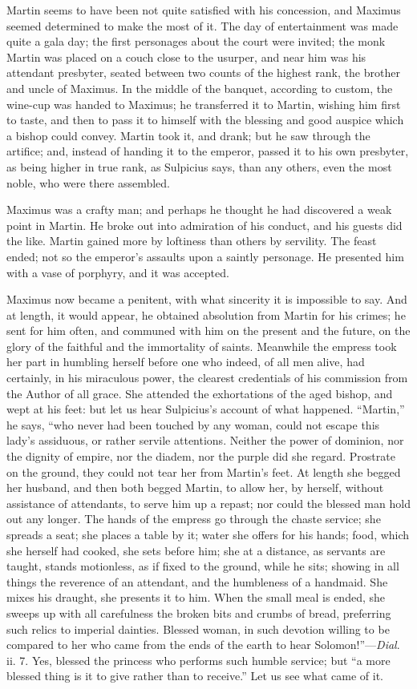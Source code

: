 Martin seems to have been not quite satisfied with his concession,
and Maximus seemed determined to make the most of it. The day of
entertainment was made quite a gala day; the first personages about
the court were invited; the monk Martin was placed on a couch close to
the usurper, and near him was his attendant presbyter, seated between
two counts of the highest rank, the brother and uncle of Maximus. In
the middle of the banquet, according to custom, the wine-cup was
handed to Maximus; he transferred it to Martin, wishing him first to
taste, and then to pass it to himself with the blessing and good
auspice which a bishop could convey. Martin took it, and drank; but he
saw through the artifice; and, instead of handing it to the emperor,
passed it to his own presbyter, as being higher in true rank, as
Sulpicius says, than any others, even the most noble, who were there
assembled.

Maximus was a crafty man; and perhaps he thought he had discovered
a weak point in Martin. He broke out into admiration of his conduct,
and his guests did the like. Martin gained more by loftiness than
others by servility. The feast ended; not so the emperor's assaults
upon a saintly personage. He presented him with a vase of porphyry,
and it was accepted.

Maximus now became a penitent, with what sincerity it is impossible
to say. And at length, it would appear, he obtained absolution from
Martin for his crimes; he sent for him often, and communed with him on
the present and the future, on the glory of the faithful and the
immortality of saints. Meanwhile the empress took her part in humbling
herself before one who indeed, of all men alive, had certainly, in his
miraculous power, the clearest credentials of his commission from the
Author of all grace. She attended the exhortations of the aged bishop,
and wept at his feet: but let us hear Sulpicius's account of what
happened. ``Martin,'' he says, ``who never had been
touched by any woman, could not escape this lady's assiduous, or
rather servile attentions. Neither the power of dominion, nor the
dignity of empire, nor the diadem, nor the purple did she regard.
Prostrate on the ground, they could not tear her from Martin's feet.
At length she begged her husband, and then both begged Martin, to
allow her, by herself, without assistance of attendants, to serve him
up a repast; nor could the blessed man hold out any longer. The hands
of the empress go through the chaste service; she spreads a seat; she
places a table by it; water she offers for his hands; food, which she
herself had cooked, she sets before him; she at a distance, as
servants are taught, stands motionless, as if fixed to the ground,
while he sits; showing in all things the reverence of an attendant,
and the humbleness of a handmaid. She mixes his draught, she
presents it to him. When the small meal is ended, she sweeps up with
all carefulness the broken bits and crumbs of bread, preferring such
relics to imperial dainties. Blessed woman, in such devotion willing
to be compared to her who came from the ends of the earth to hear
Solomon!''—\emph{Dial}. ii. 7. Yes, blessed the princess who
performs such humble service; but ``a more blessed thing is it to
give rather than to receive.'' Let us see what came of it.

